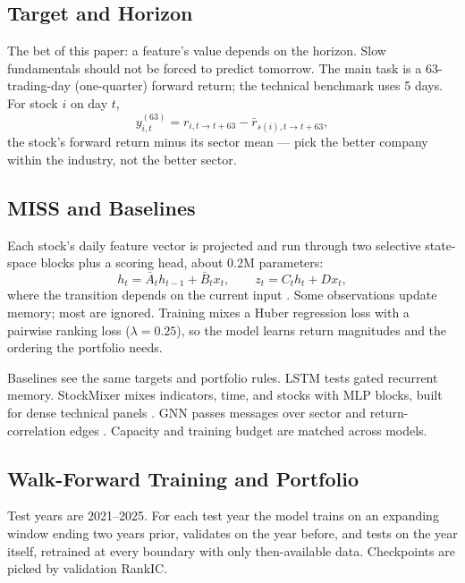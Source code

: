 \documentclass[11pt,twocolumn]{article}
\begin{document}
\subsection{Target and Horizon}

The bet of this paper: a feature's value depends on the horizon. Slow
fundamentals should not be forced to predict tomorrow. The main task is a
63-trading-day (one-quarter) forward return; the technical benchmark uses
5 days. For stock $i$ on day $t$,
\begin{equation}
y^{(63)}_{i,t} = r_{i,t\rightarrow t+63} - \bar{r}_{s(i),t\rightarrow t+63},
\end{equation}
the stock's forward return minus its sector mean --- pick the better
company within the industry, not the better sector.

\subsection{MISS and Baselines}

Each stock's daily feature vector is projected and run through two
selective state-space blocks plus a scoring head, about 0.2M parameters:
\begin{equation}
h_t = \bar{A}_t h_{t-1} + \bar{B}_t x_t, \qquad
z_t = C_t h_t + D x_t,
\end{equation}
where the transition depends on the current input \cite{gu2023}. Some
observations update memory; most are ignored. Training mixes a Huber
regression loss with a pairwise ranking loss ($\lambda = 0.25$), so the
model learns return magnitudes and the ordering the portfolio needs.

Baselines see the same targets and portfolio rules. LSTM tests gated
recurrent memory. StockMixer mixes indicators, time, and stocks with MLP
blocks, built for dense technical panels \cite{fan2024}. GNN passes
messages over sector and return-correlation edges \cite{feng2019,qian2024}.
Capacity and training budget are matched across models.

\subsection{Walk-Forward Training and Portfolio}

Test years are 2021--2025. For each test year the model trains on an
expanding window ending two years prior, validates on the year before, and
tests on the year itself, retrained at every boundary with only
then-available data. Checkpoints are picked by validation RankIC.
\end{document}
